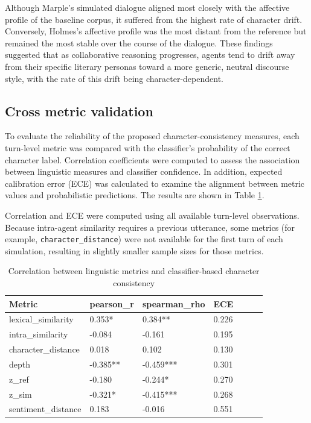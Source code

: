 \documentclass{article}
\begin{document}
Although Marple's simulated dialogue aligned most closely with the affective profile of the baseline corpus, it suffered from the highest rate of character drift. Conversely, Holmes's affective profile was the most distant from the reference but remained the most stable over the course of the dialogue. These findings suggested that as collaborative reasoning progresses, agents tend to drift away from their specific literary personas toward a more generic, neutral discourse style, with the rate of this drift being character-dependent.


\subsection{Cross metric validation} \label{sec:results_validation}

To evaluate the reliability of the proposed character-consistency measures, each turn-level metric was compared with the classifier's probability of the correct character label. Correlation coefficients were computed to assess the association between linguistic measures and classifier confidence. In addition, expected calibration error (ECE) was calculated to examine the alignment between metric values and probabilistic predictions. The results are shown in Table \ref{tab:master_table}.

Correlation and ECE were computed using all available turn-level observations. Because intra-agent similarity requires a previous utterance, some metrics (for example, \texttt{character\_distance}) were not available for the first turn of each simulation, resulting in slightly smaller sample sizes for those metrics.

\begin{table}[h]
\centering
\begin{tabular}{l l l l l l l}\toprule
Metric & pearson\_r & spearman\_rho & ECE \\\midrule
lexical\_similarity & 0.353*& 0.384**& 0.226 \\
intra\_similarity & -0.084 & -0.161 & 0.195 \\
character\_distance & 0.018 & 0.102 & 0.130 \\
depth & -0.385**& -0.459***& 0.301 \\
z\_ref & -0.180 & -0.244*& 0.270 \\
z\_sim & -0.321*& -0.415***& 0.268 \\
sentiment\_distance & 0.183 & -0.016 & 0.551 \\ \bottomrule
\end{tabular}
\caption{Correlation between linguistic metrics and classifier-based character consistency}
\label{tab:master_table}
\end{table}
\end{document}
